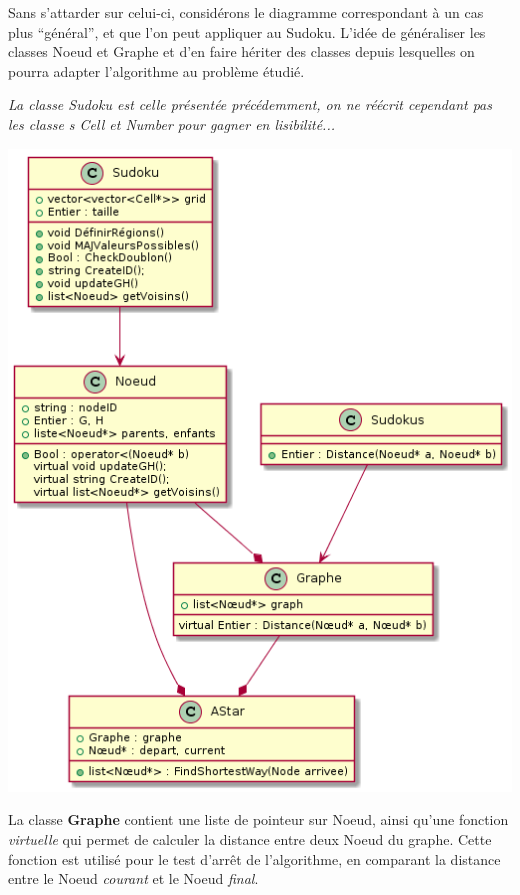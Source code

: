 \begin{description}
\begin{center}
              \end{center}
              
Sans s'attarder sur celui-ci, considérons le diagramme correspondant à un cas plus ``général'', et que l'on peut appliquer au Sudoku. L'idée de généraliser les classes Noeud et Graphe et d'en faire hériter des classes depuis lesquelles on pourra adapter l'algorithme au problème étudié.

\textit{La classe Sudoku est celle présentée précédemment, on ne réécrit cependant pas les classe s Cell et Number pour gagner en  lisibilité...}

\begin{center}
\includegraphics[scale = 0.5]{images/Astar_sudoku_classe.png}
\end{center}



La classe \textbf{Graphe} contient une liste de pointeur sur Noeud, ainsi qu'une fonction \textit{ virtuelle} qui permet de calculer la distance entre deux Noeud du graphe. Cette fonction est utilisé pour le test d'arrêt de l'algorithme, en comparant la distance entre le Noeud \textit{courant} et le Noeud \textit{final}.


\end{description}
